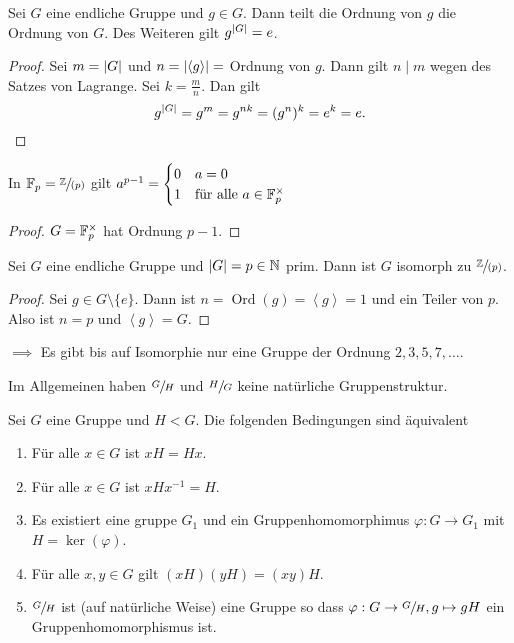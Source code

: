 \begin{corollary}
	Sei $G$ eine endliche Gruppe und $g \in G$. Dann teilt die Ordnung von $g$ die Ordnung von $G$.
	Des Weiteren gilt $g^{\abs{G}} = e$.
\end{corollary}

\begin{proof}
	Sei $m = \abs{G}$ und $n = \abs{\left< g \right>} =$ Ordnung von $g$.
	Dann gilt $n \mid m$ wegen des Satzes von Lagrange.
	Sei $k = \frac{m}{n}$. Dan gilt
	\[
		g^{\abs{G}} = g^{m} = g^{nk} = (g^{n})^{k} = e^{k} = e
	.\] 
\end{proof}

\begin{corollary}
	In $\mathbb{F}_{p} = \sfrac{\mathbb{Z}}{(p)}$ gilt $a^{p-1} = \begin{cases}
		0 &a = 0\\
		1 &\text{für alle } a \in \mathbb{F}_{p}^{\times}
	\end{cases}$
\end{corollary}

\begin{proof}
	$G = \mathbb{F}_{p}^{\times }$ hat Ordnung $p-1$.
\end{proof}

\begin{corollary}
	Sei $G$ eine endliche Gruppe und $\abs{G} = p \in \mathbb{N}$ prim. Dann ist $G$ isomorph zu $\sfrac{\mathbb{Z}}{(p)}$.
\end{corollary}

\begin{proof}
	Sei $g \in G \setminus \{e\} $. Dann ist $n = \operatorname{Ord}(g) = \left< g \right> = 1$ und ein Teiler von $p$.
	Also ist $n = p$ und $\left< g \right> = G$.
\end{proof}

$\implies$ Es gibt bis auf Isomorphie nur eine Gruppe der Ordnung $2,3,5,7,\ldots$.

Im Allgemeinen haben $\sfrac{G}{H}$ und $\sfrac{H}{G}$ keine natürliche Gruppenstruktur.

\begin{theorem}
	Sei $G$ eine Gruppe und $H < G$. Die folgenden Bedingungen sind äquivalent
	\begin{enumerate}[(1)]
		\item Für alle $x \in G$ ist $x H = H x$.
		\item Für alle  $x \in G$ ist $x H x^{-1} = H$.
		\item Es existiert eine gruppe $G_1$ und ein Gruppenhomomorphimus $\varphi: G \to G_1$ mit $H = \ker(\varphi)$.
		\item Für alle $x,y \in G$ gilt $(xH)(yH) = (xy) H$.
		\item $\sfrac{G}{H}$ ist (auf natürliche Weise) eine Gruppe so dass $\varphi: G \to \sfrac{G}{H}, g \mapsto g H$ ein Gruppenhomomorphismus ist.
	\end{enumerate}
\end{theorem}

